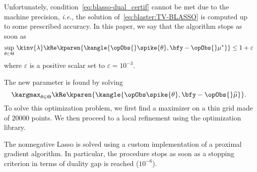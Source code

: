 Unfortunately, condition~\eqref{eq:blasso-dual_certif} cannot be met due to the machine precision, \textit{i.e.}, the solution of~\eqref{eq:blaster:TV-BLASSO} is computed up to some prescribed accuracy.
In this paper, we say that the algorithm stops as soon as
\begin{equation}
	\sup_{\theta\in\Theta} \, \kinv{\lambda}\kRe\kparen{\kangle{
		\opObs{}\spike{\theta}, \bfy - \opObs{}\mu^\star
	}}
	\leq 1 + \varepsilon
\end{equation}
where $\varepsilon$ is a positive scalar set to $\varepsilon=10^{-3}$.

The new parameter is found by solving
\begin{equation}
	\kargmax_{\theta\in\Theta} \kRe\kparen{\kangle{\opObs\spike{\theta}, \bfy - \opObs{}\widehat{\mu}}}
	.
\end{equation}
To solve this optimization problem, we first find a maximizer on a thin grid made of $20000$ points.
We then proceed to a local refinement using the  optimization library.

The nonnegative Lasso is solved using a custom implementation of a proximal gradient algorithm.
In particular, the procedure stops as soon as a stopping criterion in terms of duality gap is reached ($10^{-6}$).

